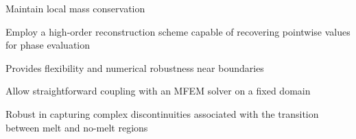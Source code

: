 \documentclass[usenames,dvipsnames,letterpaper,landscape,final]{slides}
\theoremstyle{definition}
\begin{document}

\begin{myslide}
		  \begin{blist}\raggedright
		  \item Maintain local mass conservation
					 \vspace{0.5cm}
		  \item Employ a high-order reconstruction scheme capable of recovering pointwise values for phase evaluation
                \vspace{0.5cm}
		  \item Provides flexibility and numerical robustness near boundaries
					 \vspace{0.5cm}
		  \item Allow straightforward coupling with an MFEM solver on a fixed domain
					 \vspace{0.5cm}
		  \item Robust in capturing complex discontinuities associated with the transition between melt and no-melt regions
		  \end{blist}

\end{myslide}
\end{document}
